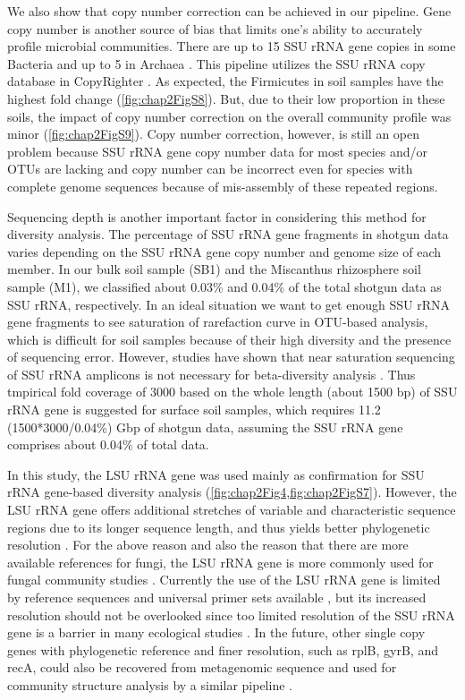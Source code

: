 \documentclass[]{msu-thesis}
\begin{document}
We also show that copy number correction can be achieved in our pipeline. Gene copy number is another source of bias that limits one’s ability to accurately profile microbial communities. There are up to 15 SSU rRNA gene copies in some Bacteria and up to 5 in Archaea \cite{acinas_divergence_2004}. This pipeline utilizes the SSU rRNA copy database in CopyRighter \cite{angly_copyrighter:_2014}. As expected, the Firmicutes in soil samples have the highest fold change (\cref{fig:chap2FigS8}). But, due to their low proportion in these soils, the impact of copy number correction on the overall community profile was minor (\cref{fig:chap2FigS9}). Copy number correction, however, is still an open problem because SSU rRNA gene copy number data for most species and/or OTUs are lacking and copy number can be incorrect even for species with complete genome sequences because of mis-assembly of these repeated regions. 

Sequencing depth is another important factor in considering this method for diversity analysis. The percentage of SSU rRNA gene fragments in shotgun data varies depending on the SSU rRNA gene copy number and genome size of each member. In our bulk soil sample (SB1) and the Miscanthus rhizosphere soil sample (M1), we classified about 0.03\% and 0.04\% of the total shotgun data as SSU rRNA, respectively. In an ideal situation we want to get enough SSU rRNA gene fragments to see saturation of rarefaction curve in OTU-based analysis, which is difficult for soil samples because of their high diversity and the presence of sequencing error. However, studies have shown that near saturation sequencing of SSU rRNA amplicons is not necessary for beta-diversity analysis \cite{caporaso_ultra-high-throughput_2012,kuczynski_microbial_2010}. Thus tmpirical fold coverage of 3000 based on the whole length (about 1500 bp) of SSU rRNA gene is suggested for surface soil samples, which requires 11.2 (1500*3000/0.04\%) Gbp of shotgun data, assuming the SSU rRNA gene comprises about 0.04\% of total data.

In this study, the LSU rRNA gene was used mainly as confirmation for SSU rRNA gene-based diversity analysis (\cref{fig:chap2Fig4,fig:chap2FigS7}). However, the LSU rRNA gene offers additional stretches of variable and characteristic sequence regions due to its longer sequence length, and thus yields better phylogenetic resolution \cite{hunt_evaluation_2006}. For the above reason and also the reason that there are more available references for fungi, the LSU rRNA gene is more commonly used for fungal community studies \cite{mummey_evaluation_2007,liu_accurate_2012,porter_factors_2012,begerow_current_2010}. Currently the use of the LSU rRNA gene is limited by reference sequences and universal primer sets available \cite{hunt_evaluation_2006}, but its increased resolution should not be overlooked since too limited resolution of the SSU rRNA gene is a barrier in many ecological studies \cite{lindahl_fungal_2013}. In the future, other single copy genes with phylogenetic reference and finer resolution, such as rplB, gyrB, and recA, could also be recovered from metagenomic sequence and used for community structure analysis by a similar pipeline \cite{roux_comparison_2011}.
\end{document}
